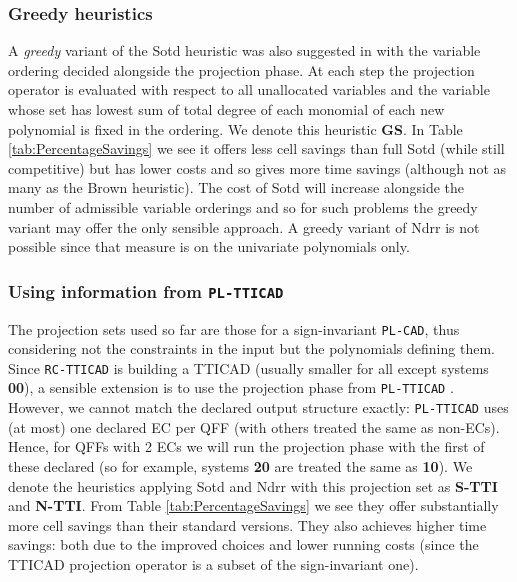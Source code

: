\documentclass[runningheads,a4paper]{llncs}
\begin{document}
\vspace*{-10pt}

\subsubsection*{Greedy heuristics}

A \emph{greedy} variant of the Sotd heuristic was also suggested in \cite{DSS04} with the variable ordering decided alongside the projection phase.  At each step the projection operator is evaluated with respect to all unallocated variables and the variable whose set has lowest sum of total degree of each monomial of each new polynomial is fixed in the ordering.  We denote this heuristic \textbf{GS}.  In Table \ref{tab:PercentageSavings} we see it offers less cell savings than full Sotd (while still competitive) but has lower costs and so gives more time savings (although not as many as the Brown heuristic).  
The cost of Sotd will increase alongside the number of admissible variable orderings and so for such problems the greedy variant may offer the only sensible approach.
A greedy variant of Ndrr is not possible since that measure is on the univariate polynomials only.

\vspace*{-10pt}

\subsubsection*{Using information from \textbf{\texttt{PL-TTICAD}}}

The projection sets used so far are those for a sign-invariant \texttt{PL-CAD}, thus considering not the constraints in the input but the polynomials defining them.  Since \texttt{RC-TTICAD} is building a TTICAD (usually smaller for all except systems \textbf{00}), a sensible extension is to use the projection phase from \texttt{PL-TTICAD} \cite{BDEMW14}.  However, we cannot match the declared output structure exactly: \texttt{PL-TTICAD} uses (at most) one declared EC per QFF (with others treated the same as non-ECs).  Hence, for QFFs with 2 ECs we will run the projection phase with the first of these declared (so for example, systems \textbf{20} are treated the same as \textbf{10}).  We denote the heuristics applying Sotd and Ndrr with this projection set as \textbf{S-TTI} and \textbf{N-TTI}.  From Table \ref{tab:PercentageSavings} we see they offer substantially more cell savings than their standard versions.  They also achieves higher time savings: both due to the improved choices and lower running costs (since the TTICAD projection operator is a subset of the sign-invariant one).
\end{document}
